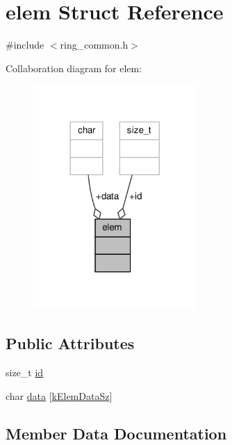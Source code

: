 \hypertarget{structelem}{}\section{elem Struct Reference}
\label{structelem}


{\ttfamily \#include $<$ring\+\_\+common.\+h$>$}



Collaboration diagram for elem\+:\nopagebreak
\begin{figure}[H]
\begin{center}
\leavevmode
\includegraphics[width=176pt]{structelem__coll__graph}
\end{center}
\end{figure}
\subsection*{Public Attributes}
\begin{DoxyCompactItemize}
\item 
size\+\_\+t \hyperlink{structelem_a76c978bdb5b9645b0b2101b54b456d01}{id}
\item 
char \hyperlink{structelem_a135640bfc2ee968d1358592d8e9769e6}{data} \mbox{[}\hyperlink{ring__common_8h_a9036cd5ac8a8aa2ff3a4e4e00536f6d6}{k\+Elem\+Data\+Sz}\mbox{]}
\end{DoxyCompactItemize}


\subsection{Member Data Documentation}
\mbox{\label{structelem_a135640bfc2ee968d1358592d8e9769e6}} 
